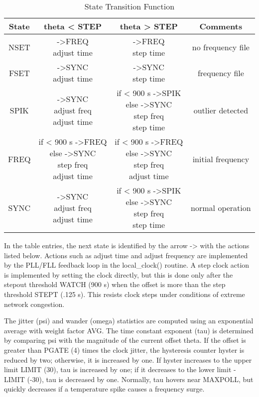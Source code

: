 \begin{table}[htb]
\center
\begin{tabular}{c | c | c | c}
State & theta < STEP        & theta > STEP      & Comments \\
\hline
\hline
NSET & \makecell{->FREQ \\ adjust time} & \makecell{->FREQ \\ step time} & no frequency file \\
FSET & \makecell{->SYNC \\ adjust time} & \makecell{->SYNC \\ step time} & frequency file \\
SPIK & \makecell{->SYNC \\ adjust freq \\ adjust time} & \makecell{if < 900 s ->SPIK \\ else ->SYNC \\ step freq \\ step time} & outlier detected \\
FREQ & \makecell{if < 900 s ->FREQ \\ else ->SYNC \\ step freq \\ adjust time} & \makecell{if < 900 s ->FREQ \\ else ->SYNC \\ step freq \\ adjust time} & initial frequency \\
SYNC & \makecell{->SYNC \\ adjust freq \\ adjust time} & \makecell{if < 900 s ->SPIK \\ else ->SYNC \\ step freq \\ step time} & normal operation \\       
\hline
\end{tabular}
\label{state_transition_function}
\caption{State Transition Function}
\end{table}

In the table entries, the next state is identified by the arrow ->
with the actions listed below.  Actions such as adjust time and
adjust frequency are implemented by the PLL/FLL feedback loop in the
local\_clock() routine.  A step clock action is implemented by setting
the clock directly, but this is done only after the stepout threshold
WATCH (900 s) when the offset is more than the step threshold STEPT
(.125 s).  This resists clock steps under conditions of extreme
network congestion.

The jitter (psi) and wander (omega) statistics are computed using an
exponential average with weight factor AVG.  The time constant
exponent (tau) is determined by comparing psi with the magnitude of
the current offset theta.  If the offset is greater than PGATE (4)
times the clock jitter, the hysteresis counter hyster is reduced by
two; otherwise, it is increased by one.  If hyster increases to the
upper limit LIMIT (30), tau is increased by one; if it decreases to
the lower limit -LIMIT (-30), tau is decreased by one.  Normally, tau
hovers near MAXPOLL, but quickly decreases if a temperature spike
causes a frequency surge.
